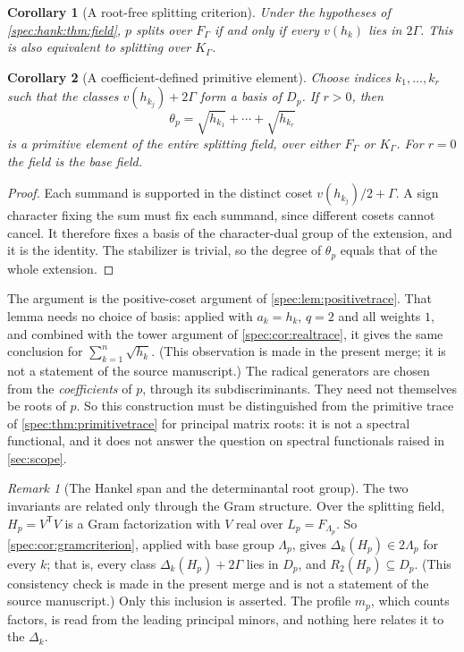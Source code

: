 \documentclass[11pt,a4paper]{article}
\numberwithin{equation}{section}
\newtheorem{corollary}[corollary]{Corollary}
\theoremstyle{definition}
\theoremstyle{remark}
\newtheorem{remark}[remark]{Remark}
\begin{document}
\begin{corollary}[A root-free splitting criterion]\label{spec:hank:cor:split}
Under the hypotheses of \cref{spec:hank:thm:field}, $p$ splits over $F_\Gamma$
if and only if every $v(h_k)$ lies in $2\Gamma$. This is also equivalent to
splitting over $K_\Gamma$.
\end{corollary}

\begin{corollary}[A coefficient-defined primitive element]\label{spec:hank:cor:primitive}
Choose indices $k_1,\ldots,k_r$ such that the classes $v(h_{k_j})+2\Gamma$
form a basis of $D_p$. If $r>0$, then
\[
 \theta_p=\sqrt{h_{k_1}}+\cdots+\sqrt{h_{k_r}}
\]
is a primitive element of the entire splitting field, over either $F_\Gamma$
or $K_\Gamma$. For $r=0$ the field is the base field.
\end{corollary}
\begin{proof}
Each summand is supported in the distinct coset $v(h_{k_j})/2+\Gamma$. A sign
character fixing the sum must fix each summand, since different cosets
cannot cancel. It therefore fixes a basis of the character-dual group of the
extension, and it is the identity. The stabilizer is trivial, so the degree
of $\theta_p$ equals that of the whole extension.
\end{proof}

The argument is the positive-coset argument of \cref{spec:lem:positivetrace}.
That lemma needs no choice of basis: applied with $a_k=h_k$, $q=2$ and all
weights $1$, and combined with the tower argument of
\cref{spec:cor:realtrace}, it gives the same conclusion for
$\sum_{k=1}^n\sqrt{h_k}$. (This observation is made in the present merge; it
is not a statement of the source manuscript.) The radical generators are
chosen from the \emph{coefficients} of $p$, through its subdiscriminants. They
need not themselves be roots of $p$. So this construction must be
distinguished from the primitive trace of \cref{spec:thm:primitivetrace} for
principal matrix roots: it is not a spectral functional, and it does not
answer the question on spectral functionals raised in \cref{sec:scope}.

\begin{remark}[The Hankel span and the determinantal root group]
\label{spec:hank:rem:twoinvariants}
The two invariants are related only through the Gram structure. Over the
splitting field, $H_p=V^{\mathsf T}V$ is a Gram factorization with $V$ real
over $L_p=F_{\Lambda_p}$. So \cref{spec:cor:gramcriterion}, applied with base
group $\Lambda_p$, gives $\Delta_k(H_p)\in2\Lambda_p$ for every $k$; that is,
every class $\Delta_k(H_p)+2\Gamma$ lies in $D_p$, and
$R_2(H_p)\subseteq D_p$. (This consistency check is made in the present merge
and is not a statement of the source manuscript.) Only this inclusion is
asserted. The profile $m_p$, which counts factors, is read from the leading
principal minors, and nothing here relates it to the $\Delta_k$.
\end{remark}
\end{document}
